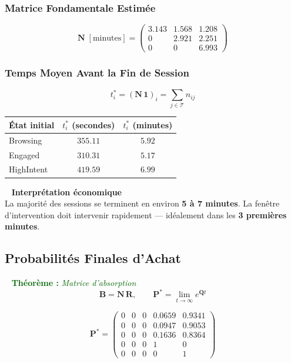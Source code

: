 \documentclass[11pt,a4paper]{article}
\newenvironment{thmbox}[1]{%
  \vspace{3pt}\begin{framed}
  \noindent{\color{DarkGreen}\rule{0.3cm}{3pt}}~%
  \textcolor{DarkGreen}{\textbf{Théorème :} \textit{#1}}\\[3pt]}
  {\end{framed}\vspace{3pt}}
\newenvironment{insightbox}{%
  \vspace{3pt}\begin{framed}
  \noindent{\color{NavyBlue}\rule{0.3cm}{3pt}}~%
  \textcolor{NavyBlue}{\textbf{Interprétation économique}}\\[3pt]}
  {\end{framed}\vspace{3pt}}
\newcommand{\mat}[1]{\mathbf{#1}}
\begin{document}
\subsubsection{Matrice Fondamentale Estimée}

\[
\mat{N}\;[\text{minutes}] =
\begin{pmatrix}
3.143 & 1.568 & 1.208 \\
0     & 2.921 & 2.251 \\
0     & 0     & 6.993
\end{pmatrix}
\]

\subsubsection{Temps Moyen Avant la Fin de Session}

\[
\boxed{t_i^* = (\mat{N}\,\mathbf{1})_i = \sum_{j \in \mathcal{T}} n_{ij}}
\]

\begin{center}
\begin{tabular}{lcc}
\toprule
\textbf{État initial} & $t_i^*$ (secondes) & $t_i^*$ (minutes) \\
\midrule
\rowcolor{LightBlue}   Browsing   & $355.11$ & $\mathbf{5.92}$ \\
\rowcolor{LightOrange} Engaged    & $310.31$ & $\mathbf{5.17}$ \\
\rowcolor{LightRed}    HighIntent & $419.59$ & $\mathbf{6.99}$ \\
\bottomrule
\end{tabular}
\end{center}

\begin{insightbox}
La majorité des sessions se terminent en environ \textbf{5 à 7 minutes}.
La fenêtre d'intervention doit intervenir rapidement --- idéalement dans les
\textbf{3 premières minutes}.
\end{insightbox}

\subsection{Probabilités Finales d'Achat}

\begin{thmbox}{Matrice d'absorption}
\[
\mat{B} = \mat{N}\,\mat{R}, \qquad \mat{P}^* = \lim_{t\to\infty}e^{\mat{Q}t}
\]
\end{thmbox}

\[
\mat{P}^* =
\begin{pmatrix}
0&0&0& \mathbf{0.0659} & 0.9341 \\
0&0&0& \mathbf{0.0947} & 0.9053 \\
0&0&0& \mathbf{0.1636} & 0.8364 \\
0&0&0& 1 & 0 \\ 0&0&0& 0 & 1
\end{pmatrix}
\]
\end{document}
